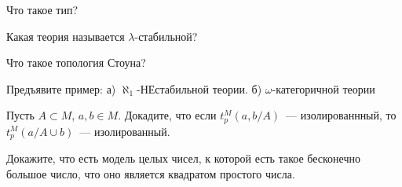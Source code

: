 \setcounter{curtask}{1}


\begin{task}
    Что такое тип?
\end{task}

\begin{task}
    Какая теория называется $\lambda$-стабильной?
\end{task}

\begin{task}
	Что такое топология Стоуна?
\end{task}

\breakline

\begin{task}
    Предъявите пример:
    а) $\aleph_1$-НЕстабильной теории.
    б) $\omega$-категоричной теории
\end{task}

\begin{task}
    Пусть $A \subset M$, $a, b \in M$. Докадите, что если $t_p^M(a, b / A)$~---
    изолированнный, то $t_p^M(a / A \cup {b})$~--- изолированный.
\end{task}

\begin{task}
    Докажите, что есть модель целых чисел, к которой есть такое бесконечно большое
    число, что оно является квадратом простого числа.
\end{task}